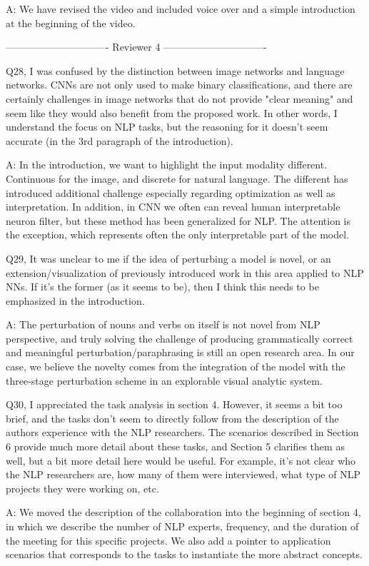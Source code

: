 A: We have revised the video and included voice over and a simple introduction at the beginning of the video.


------------------------------- Reviewer 4 -------------------------------

Q28, I was confused by the distinction between image networks and language networks. CNNs are not only used to make binary classifications, and there are certainly challenges in image networks that do not provide "clear meaning" and seem like they would also benefit from the proposed work. In other words, I understand the focus on NLP tasks, but the reasoning for it doesn't seem accurate (in the 3rd paragraph of the introduction).

A: In the introduction, we want to highlight the input modality different. Continuous for the image, and discrete for natural language. The different has introduced additional challenge especially regarding optimization as well as interpretation. In addition, in CNN we often can reveal human interpretable neuron filter, but these method has been generalized for NLP. The attention is the exception, which represents often the only interpretable part of the model.

Q29, It was unclear to me if the idea of perturbing a model is novel, or an extension/visualization of previously introduced work in this area applied to NLP NNs. If it's the former (as it seems to be), then I think this needs to be emphasized in the introduction.

A: The perturbation of nouns and verbs on itself is not novel from NLP perspective, and truly solving the challenge of producing grammatically correct and meaningful perturbation/paraphrasing is still an open research area. In our case, we believe the novelty comes from the integration of the model with the three-stage perturbation scheme in an explorable visual analytic system.

Q30, I appreciated the task analysis in section 4. However, it seems a bit too brief, and the tasks don't seem to directly follow from the description of the authors experience with the NLP researchers. The scenarios described in Section 6 provide much more detail about these tasks, and Section 5 clarifies them as well, but a bit more detail here would be useful. For example, it's not clear who the NLP researchers are, how many of them were interviewed, what type of NLP projects they were working on, etc.

A: We moved the description of the collaboration into the beginning of section 4, in which we describe the number of NLP experts, frequency, and the duration of the meeting for this specific projects. We also add a pointer to application scenarios that corresponds to the tasks to instantiate the more abstract concepts.

